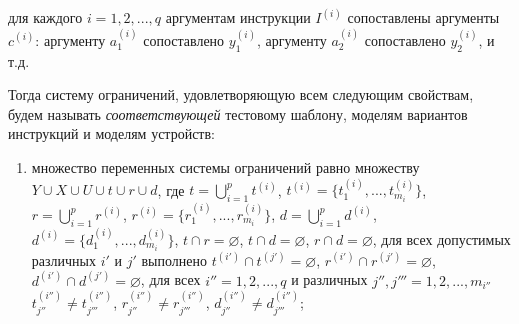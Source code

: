для каждого $i = 1, 2, ..., q$ аргументам инструкции $I^{(i)}$ сопоставлены аргументы $c^{(i)}$: аргументу $a_1^{(i)}$ сопоставлено $y_1^{(i)}$, аргументу $a_2^{(i)}$ сопоставлено $y_2^{(i)}$, и т.д.

Тогда систему ограничений, удовлетворяющую всем следующим свойствам, будем называть \emph{соответствующей} тестовому шаблону, моделям вариантов инструкций и моделям устройств:
  \begin{enumerate}
    \item множество переменных системы ограничений равно множеству $Y \cup X \cup U \cup t \cup r \cup d$, где $t = \bigcup_{i=1}^p t^{(i)}$, $t^{(i)} = \{t_1^{(i)}, ..., t_{m_i}^{(i)}\}$, $r = \bigcup_{i=1}^p r^{(i)}$, $r^{(i)} = \{r_1^{(i)}, ..., r_{m_i}^{(i)}\}$, $d = \bigcup_{i=1}^p d^{(i)}$, $d^{(i)} = \{d_1^{(i)}, ..., d_{m_i}^{(i)}\}$, $t \cap r = \varnothing$, $t \cap d = \varnothing$, $r \cap d = \varnothing$, для всех допустимых различных $i'$ и $j'$ выполнено $t^{(i')} \cap t^{(j')} = \varnothing$, $r^{(i')} \cap r^{(j')} = \varnothing$, $d^{(i')} \cap d^{(j')} = \varnothing$, для всех $i'' = 1, 2, ..., q$ и различных $j'', j''' = 1, 2, ..., m_{i''}$ $t_{j''}^{(i'')} \neq t_{j'''}^{(i'')}$, $r_{j''}^{(i'')} \neq r_{j'''}^{(i'')}$, $d_{j''}^{(i'')} \neq d_{j'''}^{(i'')}$;


\end{enumerate}
